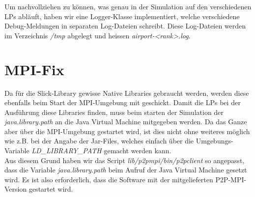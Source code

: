 \documentclass[oneside,DIV12,BCOR0.5cm,bibliography=totoc]{template}
\begin{document}
\begin{empfile}
Um nachvollziehen zu können, was genau in der Simulation auf den
verschiedenen LPs abläuft, haben wir eine Logger-Klasse implementiert,
welche verschiedene Debug-Meldungen in separaten Log-Dateien
schreibt. Diese Log-Dateien werden im Verzeichnis \emph{/tmp} abgelegt
und heissen \emph{airport-<rank>.log}.

\section{MPI-Fix}

Da für die Slick-Library gewisse Native Libraries gebraucht werden,
werden diese ebenfalls beim Start der MPI-Umgebung mit geschickt. Damit
die LPs bei der Ausführung diese Libraries finden, muss beim starten
der Simulation der \emph{java.library.path} an die Java Virtual
Machine mitgegeben werden. Da das Ganze aber über die MPI-Umgebung
gestartet wird, ist dies nicht ohne weiteres möglich wie z.B. bei
der Angabe der Jar-Files, welches einfach über die Umgebungs-Variable
\emph{LD\_LIBRARY\_PATH} gemacht werden kann.\\

Aus diesem Grund haben wir das Script \emph{lib/p2pmpi/bin/p2pclient}
so angepasst, dass die Variable \emph{java.library.path} beim Aufruf
der Java Virtual Machine gesetzt wird. Es ist also erforderlich, dass
die Software mit der mitgelieferten P2P-MPI-Version gestartet wird.


\end{empfile}
\end{document}

